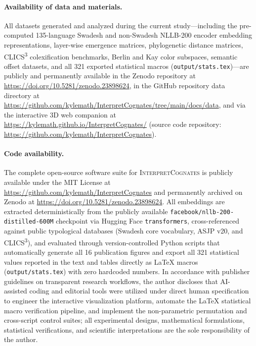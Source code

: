 \documentclass[11pt,a4paper]{article}
\begin{document}
\paragraph{Availability of data and materials.}
All datasets generated and analyzed during the current study---including the pre-computed 135-language Swadesh and non-Swadesh NLLB-200 encoder embedding representations, layer-wise emergence matrices, phylogenetic distance matrices, CLICS\textsuperscript{3} colexification benchmarks, Berlin and Kay color subspaces, semantic offset datasets, and all 321 exported statistical macros (\texttt{output/stats.tex})---are publicly and permanently available in the Zenodo repository at \url{https://doi.org/10.5281/zenodo.23898624}, in the GitHub repository data directory at \url{https://github.com/kylemath/InterpretCognates/tree/main/docs/data}, and via the interactive 3D web companion at \url{https://kylemath.github.io/InterpretCognates/} (source code repository: \url{https://github.com/kylemath/InterpretCognates}).

\paragraph{Code availability.}
The complete open-source software suite for \textsc{InterpretCognates} is publicly available under the MIT License at \url{https://github.com/kylemath/InterpretCognates} and permanently archived on Zenodo at \url{https://doi.org/10.5281/zenodo.23898624}.
All embeddings are extracted deterministically from the publicly available \texttt{facebook/\allowbreak nllb-200-\allowbreak distilled-600M} checkpoint via Hugging Face \texttt{transformers}, cross-referenced against public typological databases (Swadesh core vocabulary, ASJP v20, and CLICS\textsuperscript{3}), and evaluated through version-controlled Python scripts that automatically generate all 16 publication figures and export all 321 statistical values reported in the text and tables directly as \LaTeX{} macros (\texttt{output/stats.tex}) with zero hardcoded numbers.
In accordance with publisher guidelines on transparent research workflows, the author discloses that AI-assisted coding and editorial tools were utilized under direct human specification to engineer the interactive visualization platform, automate the \LaTeX{} statistical macro verification pipeline, and implement the non-parametric permutation and cross-script control suites; all experimental designs, mathematical formulations, statistical verifications, and scientific interpretations are the sole responsibility of the author.



\end{document}
